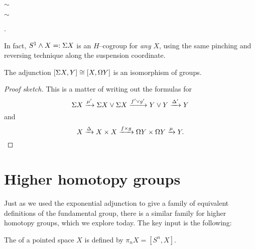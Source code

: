 \begin{example}
\begin{center}
    $\sim$
    $\sim$
    .
\end{center}
\end{example}

\begin{example}
In fact, $S^1 \wedge X =: \Sigma X$ is an $H$--cogroup for \emph{any} $X$, using the same pinching and reversing technique along the suspension coordinate.
\end{example}

\begin{lemma}
The adjunction $[\Sigma X, Y] \cong [X, \Omega Y]$ is an isomorphism of groups.
\end{lemma}
\begin{proof}[Proof sketch]
This is a matter of writing out the formulas for \[\Sigma X \xrightarrow{\mu'} \Sigma X \vee \Sigma X \xrightarrow{f' \vee g'} Y \vee Y \xrightarrow{\Delta'} Y\] and \[X \xrightarrow\Delta X \times X \xrightarrow{f \times g} \Omega Y \times \Omega Y \xrightarrow\mu Y. \qedhere\]
\end{proof}




\section{Higher homotopy groups}

Just as we used the exponential adjunction to give a family of equivalent definitions of the fundamental group, there is a similar family for higher homotopy groups, which we explore today.
The key input is the following:

\begin{definition}
The  of a pointed space $X$ is defined by $\pi_n X = [S^n, X]$.
\end{definition}

